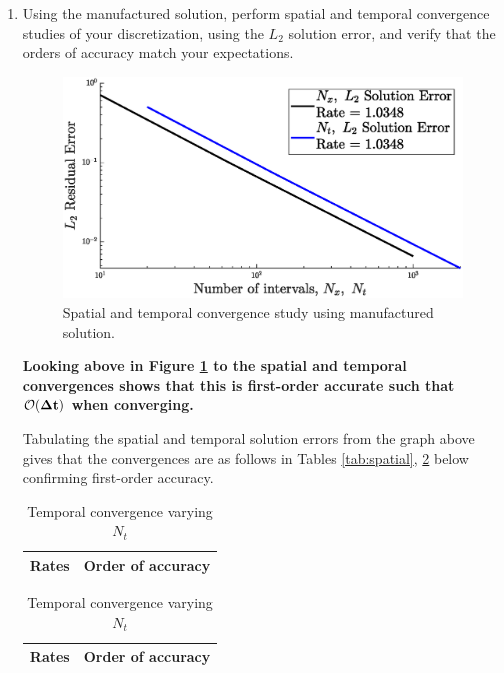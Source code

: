 \pagebreak
\begin{enumerate}[label=\alph*., start = 4]
    \item Using the manufactured solution, perform spatial and temporal convergence studies of your discretization, using the $L_2$ solution error, and verify that the orders of accuracy match your expectations.

    \begin{figure}[h]
        \centering
        \includegraphics[width = 0.9\linewidth]{q3/q3d.eps}
        \caption{Spatial and temporal convergence study using manufactured solution.}
        \label{fig:q3d}
    \end{figure}

    \begin{fminipage}{0.9\linewidth}
        \textbf{Looking above in Figure \ref{fig:q3d} to the spatial and temporal convergences shows that this is first-order accurate such that $\bf \mathcal{O}(\Delta t)$ when converging.}
    \end{fminipage}

    Tabulating the spatial and temporal solution errors from the graph above gives that the convergences are as follows in Tables \ref{tab:spatial}, \ref{tab:temporal} below confirming first-order accuracy.

    \begin{table}[h]
        \centering
        \begin{minipage}{0.4\linewidth}
            \centering
            \caption{Spatial convergence varying $N_x$}
            \label{tab:spatial}
            \begin{tabular}{l l}
                Rates & Order of accuracy\\\hline
                
            \end{tabular}
        \end{minipage}%
        \begin{minipage}{0.4\linewidth}
            \centering
            \caption{Temporal convergence varying $N_t$}
            \label{tab:temporal}
            \begin{tabular}{l l}
                Rates & Order of accuracy\\\hline
                
            \end{tabular}
        \end{minipage}
    \end{table}


\end{enumerate}